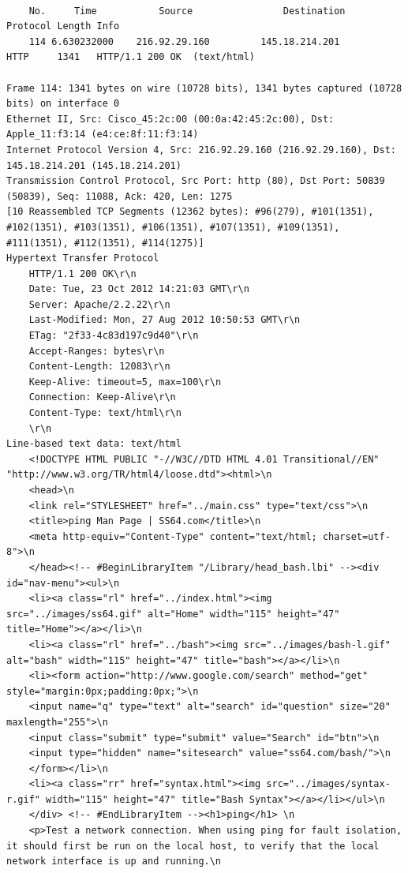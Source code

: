 \documentclass[12pt]{article} %
\begin{document}
    \begin{verbatim}

    No.     Time           Source                Destination           Protocol Length Info
    114 6.630232000    216.92.29.160         145.18.214.201        HTTP     1341   HTTP/1.1 200 OK  (text/html)

Frame 114: 1341 bytes on wire (10728 bits), 1341 bytes captured (10728 bits) on interface 0
Ethernet II, Src: Cisco_45:2c:00 (00:0a:42:45:2c:00), Dst: Apple_11:f3:14 (e4:ce:8f:11:f3:14)
Internet Protocol Version 4, Src: 216.92.29.160 (216.92.29.160), Dst: 145.18.214.201 (145.18.214.201)
Transmission Control Protocol, Src Port: http (80), Dst Port: 50839 (50839), Seq: 11088, Ack: 420, Len: 1275
[10 Reassembled TCP Segments (12362 bytes): #96(279), #101(1351), #102(1351), #103(1351), #106(1351), #107(1351), #109(1351), #111(1351), #112(1351), #114(1275)]
Hypertext Transfer Protocol
    HTTP/1.1 200 OK\r\n
    Date: Tue, 23 Oct 2012 14:21:03 GMT\r\n
    Server: Apache/2.2.22\r\n
    Last-Modified: Mon, 27 Aug 2012 10:50:53 GMT\r\n
    ETag: "2f33-4c83d197c9d40"\r\n
    Accept-Ranges: bytes\r\n
    Content-Length: 12083\r\n
    Keep-Alive: timeout=5, max=100\r\n
    Connection: Keep-Alive\r\n
    Content-Type: text/html\r\n
    \r\n
Line-based text data: text/html
    <!DOCTYPE HTML PUBLIC "-//W3C//DTD HTML 4.01 Transitional//EN" "http://www.w3.org/TR/html4/loose.dtd"><html>\n
    <head>\n
    <link rel="STYLESHEET" href="../main.css" type="text/css">\n
    <title>ping Man Page | SS64.com</title>\n
    <meta http-equiv="Content-Type" content="text/html; charset=utf-8">\n
    </head><!-- #BeginLibraryItem "/Library/head_bash.lbi" --><div id="nav-menu"><ul>\n
    <li><a class="rl" href="../index.html"><img src="../images/ss64.gif" alt="Home" width="115" height="47" title="Home"></a></li>\n
    <li><a class="rl" href="../bash"><img src="../images/bash-l.gif" alt="bash" width="115" height="47" title="bash"></a></li>\n
    <li><form action="http://www.google.com/search" method="get" style="margin:0px;padding:0px;">\n
    <input name="q" type="text" alt="search" id="question" size="20" maxlength="255">\n
    <input class="submit" type="submit" value="Search" id="btn">\n
    <input type="hidden" name="sitesearch" value="ss64.com/bash/">\n
    </form></li>\n
    <li><a class="rr" href="syntax.html"><img src="../images/syntax-r.gif" width="115" height="47" title="Bash Syntax"></a></li></ul>\n
    </div> <!-- #EndLibraryItem --><h1>ping</h1> \n
    <p>Test a network connection. When using ping for fault isolation, it should first be run on the local host, to verify that the local network interface is up and running.\n

\end{verbatim}
\end{document}
